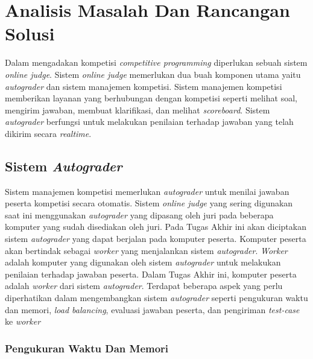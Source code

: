 \chapter{Analisis Masalah Dan Rancangan Solusi}

\par Dalam mengadakan kompetisi \textit{competitive programming} diperlukan sebuah sistem \textit{online judge}. Sistem \textit{online judge} memerlukan dua buah komponen utama yaitu \textit{autograder} dan sistem manajemen kompetisi. Sistem manajemen kompetisi memberikan layanan yang berhubungan dengan kompetisi seperti melihat soal, mengirim jawaban, membuat klarifikasi, dan melihat \textit{scoreboard}. Sistem \textit{autograder} berfungsi untuk melakukan penilaian terhadap jawaban yang telah dikirim secara \textit{realtime}.

\section{Sistem \textit{Autograder}}

\par Sistem manajemen kompetisi memerlukan \textit{autograder} untuk menilai jawaban peserta kompetisi secara otomatis. Sistem \textit{online judge} yang sering digunakan saat ini menggunakan \textit{autograder} yang dipasang oleh juri pada beberapa komputer yang sudah disediakan oleh juri. Pada Tugas Akhir ini akan diciptakan sistem \textit{autograder} yang dapat berjalan pada komputer peserta. Komputer peserta akan bertindak sebagai \textit{worker} yang menjalankan sistem \textit{autograder}. \textit{Worker} adalah komputer yang digunakan oleh sistem \textit{autograder} untuk melakukan penilaian terhadap jawaban peserta. Dalam Tugas Akhir ini, komputer peserta adalah \textit{worker} dari sistem \textit{autograder}. Terdapat beberapa aspek yang perlu diperhatikan dalam mengembangkan sistem \textit{autograder} seperti pengukuran waktu dan memori, \textit{load balancing}, evaluasi jawaban peserta, dan pengiriman \textit{test-case} ke \textit{worker}

\subsection{Pengukuran Waktu Dan Memori} \label{subsec:time-memory-measure}

